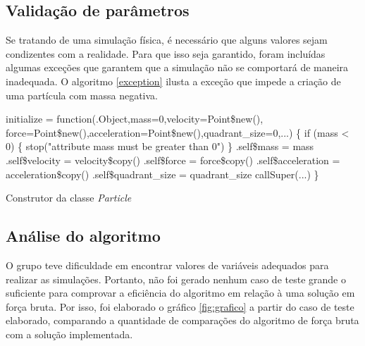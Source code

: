 \documentclass[rel_mlp]{iiufrgs}
\makeatletter
\newcommand{\nosemic}{\renewcommand{\@endalgocfline}{\relax}}%
\makeatother
\begin{document}
\subsection{Validação de parâmetros}

    Se tratando de uma simulação física, é necessário que alguns valores sejam condizentes com a realidade.
    Para que isso seja garantido, foram incluídas algumas exceções que garantem que a simulação não se comportará
    de maneira inadequada. O algoritmo \ref{exception} ilusta a exceção que impede a criação de uma partícula
    com massa negativa.

    \begin{algorithm}
        \label{exception}
        \nosemic initialize = function(.Object,mass=0,velocity=Point{\$}new(),
        \nosemic force=Point{\$}new(),acceleration=Point{\$}new(),quadrant{\_}size=0,...) {\{}
        \nosemic if (mass < 0) {\{}
        \nosemic stop("attribute mass must be greater than 0")
        \nosemic {\}}
        \nosemic .self{\$}mass = mass
        \nosemic .self{\$}velocity = velocity{\$}copy()
        \nosemic .self{\$}force = force{\$}copy()
        \nosemic .self{\$}acceleration = acceleration{\$}copy()
        \nosemic .self{\$}quadrant{\_}size = quadrant{\_}size
        \nosemic callSuper(...)
        \nosemic {\}}
        \caption{Construtor da classe \textit{Particle}}
    \end{algorithm}

\subsection{Análise do algoritmo}

O grupo teve dificuldade em encontrar valores de variáveis adequados para realizar as simulações. Portanto,
não foi gerado nenhum caso de teste grande o suficiente para comprovar a eficiência do algoritmo em relação
à uma solução em força bruta. Por isso, foi elaborado o gráfico \ref{fig:grafico} a partir do caso de teste elaborado, comparando
a quantidade de comparações do algoritmo de força bruta com a solução implementada.
\end{document}
